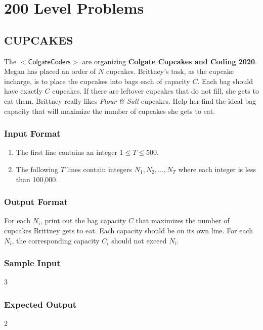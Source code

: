 \documentclass[titlepage]{article}
\begin{document}
 
\section*{200 Level Problems}
\subsection*{CUPCAKES}The $<\textsf{ColgateCoders}>$ are organizing \textbf{Colgate Cupcakes and Coding 2020}. Megan has placed an order of $N$ cupcakes. Brittney's task, as the cupcake incharge, is to place the cupcakes into bags each of capacity $C$. Each bag should have exactly $C$ cupcakes. If there are leftover cupcakes that do not fill, she gets to eat them. Brittney really likes \textsl{Flour \& Salt} cupcakes. Help her find the ideal bag capacity that will maximize the number of cupcakes she gets to eat.
\subsubsection*{Input Format}
\begin{enumerate}
\item The first line contains an integer $1\le T \le 500$.
\item The following $T$ lines contain integers $N_1, N_2, \dots, N_T$ where each integer is less than 100,000. 
\end{enumerate}
\subsubsection*{Output Format}
\hspace{10mm}For each $N_i$, print out the bag capacity $C$ that maximizes the number of cupcakes Brittney gets to eat. Each capacity should be on its own line. For each $N_i$, the corresponding capacity $C_i$ should not exceed $N_i$.
\subsubsection*{Sample Input}
3   
\subsubsection*{Expected Output}
2  
\end{document}
